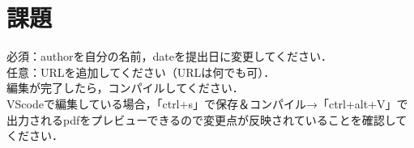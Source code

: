 \documentclass[a4paper,10pt]{jsarticle}
\begin{document}
\section{課題}
\noindent 必須：authorを自分の名前，dateを提出日に変更してください．\\
任意：URLを追加してください（URLは何でも可）．\\

\noindent 編集が完了したら，コンパイルしてください．\\
VScodeで編集している場合，「ctrl+s」で保存＆コンパイル→「ctrl+alt+V」で出力されるpdfをプレビューできるので変更点が反映されていることを確認してください．\\
\end{document}
